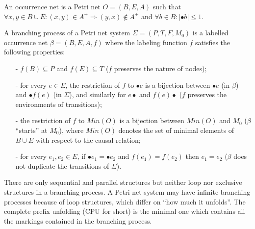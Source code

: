 \documentclass{llncs}
\begin{document}
\begin{definition}\label{def:occurrenceNet}
An occurrence net is a Petri net $O=(B,E,A)$ such that $\forall x,y\in B\cup E:(x,y)
\in A^{+}\Rightarrow(y,x)\notin A^{+}$ and $\forall b\in B:|\bullet b|\leq 1$.
\end{definition}

\begin{definition}\label{def:branchingProcess}
A branching process of a Petri net system $\Sigma=(P,T,F,M_{0})$ is a labelled occurrence net $\beta=(B,E,A,f)$ where the labeling function $f$ satisfies the following properties:
	\begin{itemize}
		\item[-] $f(B)\subseteq P$ and $f(E)\subseteq T$ ($f$ preserves the nature of nodes);
		\item[-] for every $e\in E$, the restriction of $f$ to $\bullet e$ is a bijection between $\bullet e$ (in $\beta$) and $\bullet f(e)$ (in $\Sigma$), and similarly for $e\bullet$ and $f(e)\bullet$ ($f$ preserves the environments of transitions);
		\item[-] the restriction of $f$ to $Min(O)$ is a bijection between $Min(O)$ and $M_{0}$ ($\beta$ ``starts'' at $M_{0}$), where $Min(O)$ denotes the set of minimal elements of $B\cup E$ with respect to the causal relation;
		\item[-] for every $e_{1},e_{2}\in E$, if $\bullet e_{1}=\bullet e_{2}$ and $f(e_{1})=f(e_{2})$ then $e_{1}=e_{2}$ ($\beta$ does not duplicate the transitions of $\Sigma$).
	\end{itemize}
\end{definition}

There are only sequential and parallel structures but neither loop nor exclusive structures in a branching process. A Petri net system may have infinite branching processes because of loop structures, which differ on ``how much it unfolds''. The complete prefix unfolding (CPU for short) is the minimal one which contains all the markings contained in the branching process.
\end{document}
